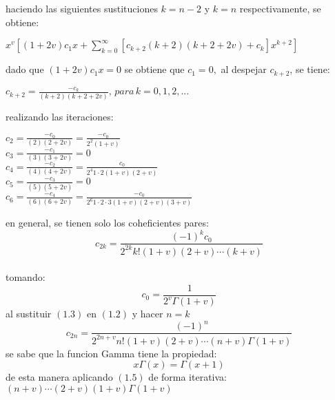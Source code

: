 \documentclass[12pt]{report}
\begin{document}
haciendo las siguientes sustituciones $k=n-2$ y $k=n$ respectivamente, se obtiene:
\begin{center}
$x^{v}[(1+2v)c_{1}x+\sum_{k=0}^{\infty}[c_{k+2}(k+2)(k+2+2v)+c_{k}]x^{k+2}]$
\end{center}
dado que $(1+2v)c_{1}x=0$ se obtiene que $c_{1}=0,$ al despejar $c_{k+2}$, se tiene:
\begin{center}
$c_{k+2}=\frac{-c_{k}}{(k+2)(k+2+2v)}, \,para\,k=0,1,2,...$
\end{center}
realizando las iteraciones:\\
\begin{center}
$c_{2}=\frac{-c_{0}}{(2)(2+2v)}=\frac{-c_{0}}{2^{2}(1+v)}$\\
\vspace{0.5cm}
$c_{3}=\frac{-c_{1}}{(3)(3+2v)}=0$
\vspace{0.5cm}\\
$c_{4}=\frac{-c_{2}}{(4)(4+2v)}=\frac{c_{0}}{2^{4}1\cdot 2(1+v)(2+v)}$
\vspace{0.5cm}\\
$c_{5}=\frac{-c_{3}}{(5)(5+2v)}=0$
\vspace{0.5cm}\\
$c_{6}=\frac{-c_{4}}{(6)(6+2v)}=\frac{-c_{0}}{2^{6}1\cdot 2\cdot 3(1+v)(2+v)(3+v)}$
\vspace{0.5cm}\\
\end{center}
en general, se tienen solo los coheficientes pares:\\
\begin{equation}
c_{2k}=\frac{(-1)^{k}c_{0}}{2^{2k}k!(1+v)(2+v)\cdots (k+v)}
\end{equation}\\
tomando:
\begin{equation}
c_{0}=\frac{1}{2^{v}\Gamma (1+v)}
\end{equation}
al sustituir $(1.3)$ en $(1.2)$ y hacer $n=k$
\begin{equation}
c_{2n}=\frac{(-1)^{n}}{2^{2n+v}n!(1+v)(2+v)\cdots (n+v)\Gamma(1+v)}
\end{equation}
se sabe que la funcion Gamma tiene la propiedad:\\
\begin{equation}
x\Gamma(x)=\Gamma(x+1)
\end{equation}
\vspace{0.3 cm}
 de esta manera aplicando $(1.5)$ de forma iterativa:\\
 \vspace{0.3 cm}
 $(n+v)\cdots(2+v)(1+v)\Gamma(1+v)$\\
\end{document}
